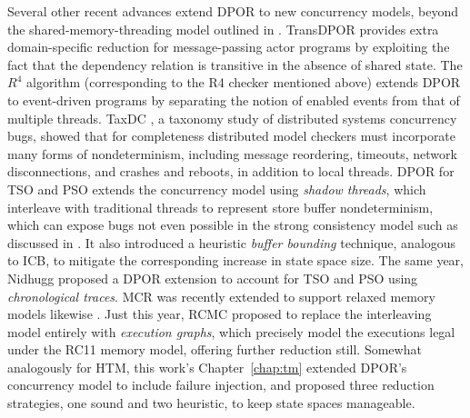 Several other recent advances extend DPOR to new concurrency models,
beyond the shared-memory-threading model outlined in \sect{\ref{sec:landslide-dpor}}.
TransDPOR \cite{transdpor} provides extra domain-specific reduction for message-passing actor programs
by exploiting the fact that the dependency relation is transitive in the absence of shared state.
The $R^4$ algorithm \cite{r4} (corresponding to the R4 checker mentioned above)
extends DPOR to event-driven programs by separating the notion of enabled events from that of multiple threads.
TaxDC \cite{taxdc}, a taxonomy study of distributed systems concurrency bugs,
showed that for completeness distributed model checkers must incorporate many forms of nondeterminism,
including message reordering, timeouts, network disconnections, and crashes and reboots, in addition to local threads.
DPOR for TSO and PSO \cite{tsopso}
extends the concurrency model
using {\em shadow threads}, which interleave with traditional threads to represent store buffer nondeterminism,
which can expose bugs not even possible in the strong consistency model
such as discussed in \sect{\ref{sec:tm-warpzone-relaxed}}.
It also introduced a heuristic {\em buffer bounding} technique, analogous to ICB,
to mitigate the corresponding increase in state space size.
The same year, Nidhugg \cite{nidhugg} proposed a DPOR extension to account for TSO and PSO
using {\em chronological traces}.
MCR was recently extended to support relaxed memory models likewise \cite{mcr-tsopso}.
Just this year, RCMC \cite{rcmc} proposed to replace the interleaving model entirely with {\em execution graphs},
which precisely model the executions legal under the RC11 memory model,
offering further reduction still.
Somewhat analogously for HTM, this work's Chapter~\ref{chap:tm}
extended DPOR's concurrency model to include failure injection,
and proposed three reduction strategies, one sound and two heuristic,
to keep state spaces manageable.

